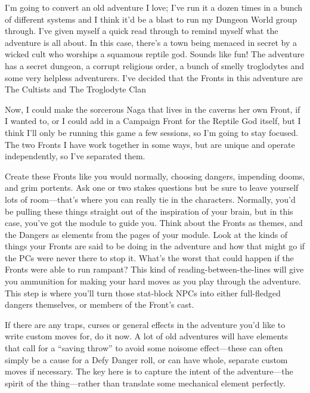  
\startExample
I’m going to convert an old adventure I love; I’ve run it a dozen times in a bunch of different systems and I think it’d be a blast to run my Dungeon World group through. I’ve given myself a quick read through to remind myself what the adventure is all about. In this case, there’s a town being menaced in secret by a wicked cult who worships a squamous reptile god. Sounds like fun! The adventure has a secret dungeon, a corrupt religious order, a bunch of smelly troglodytes and some very helpless adventurers. I’ve decided that the Fronts in this adventure are The Cultists and The Troglodyte Clan
\stopExample
 
\startExample
Now, I could make the sorcerous Naga that lives in the caverns her own Front, if I wanted to, or I could add in a Campaign Front for the Reptile God itself, but I think I’ll only be running this game a few sessions, so I’m going to stay focused. The two Fronts I have work together in some ways, but are unique and operate independently, so I’ve separated them.
\stopExample
 

Create these Fronts like you would normally, choosing dangers, impending dooms, and grim portents. Ask one or two stakes questions but be sure to leave yourself lots of room—that’s where you can really tie in the characters. Normally, you’d be pulling these things straight out of the inspiration of your brain, but in this case, you’ve got the module to guide you. Think about the Fronts as themes, and the Dangers as elements from the pages of your module. Look at the kinds of things your Fronts are said to be doing in the adventure and how that might go if the PCs were never there to stop it. What’s the worst that could happen if the Fronts were able to run rampant? This kind of reading-between-the-lines will give you ammunition for making your hard moves as you play through the adventure. This step is where you’ll turn those stat-block NPCs into either full-fledged dangers themselves, or members of the Front’s cast.

 

If there are any traps, curses or general effects in the adventure you’d like to write custom moves for, do it now. A lot of old adventures will have elements that call for a “saving throw” to avoid some noisome effect—these can often simply be a cause for a Defy Danger roll, or can have whole, separate custom moves if necessary. The key here is to capture the intent of the adventure—the spirit of the thing—rather than translate some mechanical element perfectly.

